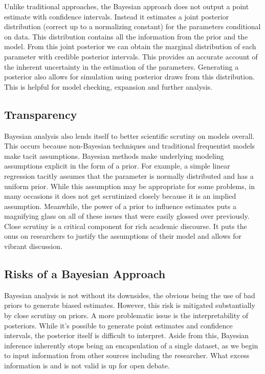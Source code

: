 \documentclass[12pt, oneside]{article}
\begin{document}
Unlike traditional approaches, the Bayesian approach does not output a point estimate with confidence intervals. Instead it estimates a joint posterior distribution (correct up to a normalizing constant) for the parameters conditional on data. This distribution contains all the information from the prior and the model. From this joint posterior we can obtain the marginal distribution of each parameter with credible posterior intervals. This provides an accurate account of the inherent uncertainty in the estimation of the parameters. Generating a posterior also allows for simulation using posterior draws from this distribution. This is helpful for model checking, expansion and further analysis.

\subsection{Transparency}
Bayesian analysis also lends itself to better scientific scrutiny on models overall. This occurs because non-Bayesian techniques and traditional frequentist models make tacit assumptions. Bayesian methods make underlying modeling assumptions explicit in the form of a prior. For example, a simple linear regression tacitly assumes that the parameter is normally distributed and has a uniform prior. While this assumption may be appropriate for some problems, in many occasions it does not get scrutinized closely because it is an implied assumption. Meanwhile, the power of a prior to influence estimates puts a magnifying glass on all of these issues that were easily glossed over previously.  Close scrutiny is a critical component for rich academic discourse. It puts the onus on researchers to justify the assumptions of their model and allows for vibrant discussion. 

\subsection{Risks of a Bayesian Approach}
Bayesian analysis is not without its downsides, the obvious being the use of bad priors to generate biased estimates. However, this risk is mitigated substantially by close scrutiny on priors. A more problematic issue is the interpretability of posteriors. While it's possible to generate point estimates and confidence intervals, the posterior itself is difficult to interpret. Aside from this, Bayesian inference inherently stops being an encapsulation of a single dataset, as we begin to input information from other sources including the researcher. What excess information is and is not valid is up for open debate.
\end{document}
